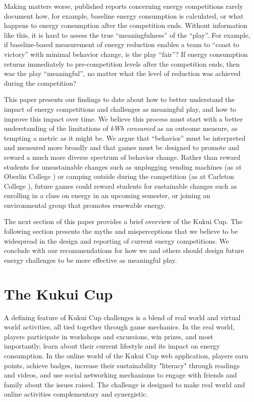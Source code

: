 \documentclass[jou]{apa} %
\begin{document}
Making matters worse, published reports concerning energy competitions rarely document
how, for example, baseline energy consumption is calculated, or what happens to energy
consumption after the competition ends.  Without information like this, it is hard to
assess the true ``meaningfulness'' of the ``play''.  For example, if baseline-based
measurement of energy reduction enables a team to ``coast to victory'' with minimal
behavior change, is the play ``fair''? If energy consumption returns immediately to
pre-competition levels after the competition ends, then was the play ``meaningful'', no
matter what the level of reduction was achieved during the competition?

This paper presents our findings to date about how to better understand the impact of
energy competitions and challenges as meaningful play, and how to improve this impact over
time.  We believe this process must start with a better understanding of the limitations
of {\em kWh consumed} as an outcome measure, as tempting a metric as it might be.  We
argue that ``behavior'' must be interpreted and measured more broadly and that games must
be designed to promote and reward a much more diverse spectrum of behavior change.  Rather
than reward students for unsustainable changes such as unplugging vending machines (as at
Oberlin College \cite{Petersen07a}) or camping outside during the competition (as at
Carleton College \cite{Hodge2010}), future games could reward students for sustainable
changes such as enrolling in a class on energy in an upcoming semester, or joining an
environmental group that promotes renewable energy.

The next section of this paper provides a brief overview of the Kukui Cup.  The following
section presents the myths and misperceptions that we believe to be widespread in the
design and reporting of current energy competitions. We conclude with our recommendations
for how we and others should design future energy challenges to be more effective as
meaningful play.

\section{The Kukui Cup}

A defining feature of Kukui Cup challenges is a blend of real world and virtual world
activities, all tied together through game mechanics.  In the real world, players
participate in workshops and excursions, win 
prizes, and most importantly, learn about their current lifestyle and its impact on
energy consumption.  In the online world of the Kukui Cup web application, players
earn points, achieve badges, increase their sustainability "literacy" through readings and
videos, and use social networking mechanisms to engage with friends and family about the
issues raised. The challenge is designed to make real world and online activities
complementary and synergistic.
\end{document}
